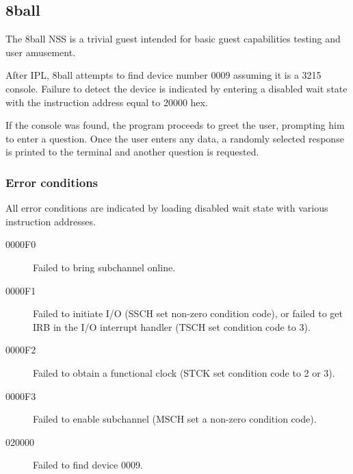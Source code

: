 \subsection{8ball}
The 8ball NSS is a trivial guest intended for basic guest capabilities
testing and user amusement.

After IPL, 8ball attempts to find device number \mbox{0009} assuming it is a
3215 console.  Failure to detect the device is indicated by entering a
disabled wait state with the instruction address equal to 20000 hex.

If the console was found, the program proceeds to greet the user, prompting
him to enter a question.  Once the user enters any data, a randomly selected
response is printed to the terminal and another question is requested.

\subsubsection*{Error conditions}
All error conditions are indicated by loading disabled wait state with
various instruction addresses.

\begin{description}
\item[0000F0] Failed to bring subchannel online.
\item[0000F1] Failed to initiate I/O (SSCH set non-zero condition code), or
	failed to get IRB in the I/O interrupt handler (TSCH set condition
	code to 3).
\item[0000F2] Failed to obtain a functional clock (STCK set condition code to
	2 or 3).
\item[0000F3] Failed to enable subchannel (MSCH set a non-zero condition code).
\item[020000] Failed to find device 0009.
\end{description}
